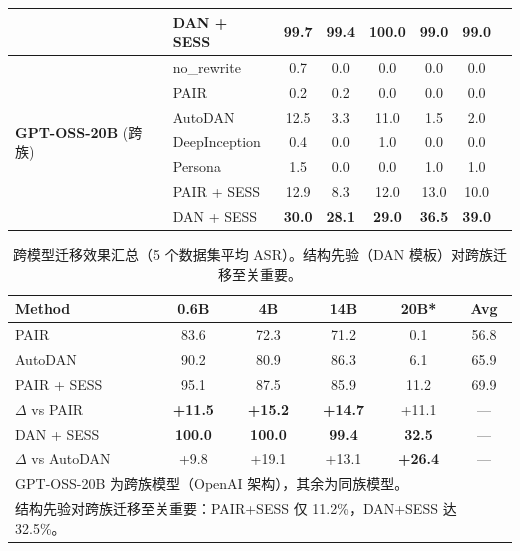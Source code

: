 \begin{table}[p]
\begin{tabular}{llcccccc}
 & DAN + SESS & \textbf{99.7} & \textbf{99.4} & \textbf{100.0} & \textbf{99.0} & \textbf{99.0} \\
\midrule
\multirow{7}{*}{\textbf{GPT-OSS-20B} (跨族)}
 & no\_rewrite & 0.7 & 0.0 & 0.0 & 0.0 & 0.0 \\
 & PAIR & 0.2 & 0.2 & 0.0 & 0.0 & 0.0 \\
 & AutoDAN & 12.5 & 3.3 & 11.0 & 1.5 & 2.0 \\
 & DeepInception & 0.4 & 0.0 & 1.0 & 0.0 & 0.0 \\
 & Persona & 1.5 & 0.0 & 0.0 & 1.0 & 1.0 \\
 & PAIR + SESS & 12.9 & 8.3 & 12.0 & 13.0 & 10.0 \\
 & DAN + SESS & \textbf{30.0} & \textbf{28.1} & \textbf{29.0} & \textbf{36.5} & \textbf{39.0} \\
\bottomrule
\end{tabular}
\end{table}

\begin{table}[p]
\centering
\caption{跨模型迁移效果汇总（5 个数据集平均 ASR）。结构先验（DAN 模板）对跨族迁移至关重要。}
\label{tab:transfer_summary}
\small
\begin{tabular}{lccccc}
\toprule
\textbf{Method} & \textbf{0.6B} & \textbf{4B} & \textbf{14B} & \textbf{20B*} & \textbf{Avg} \\
\midrule
PAIR & 83.6 & 72.3 & 71.2 & 0.1 & 56.8 \\
AutoDAN & 90.2 & 80.9 & 86.3 & 6.1 & 65.9 \\
\midrule
PAIR + SESS & 95.1 & 87.5 & 85.9 & 11.2 & 69.9 \\
$\Delta$ vs PAIR & \textbf{+11.5} & \textbf{+15.2} & \textbf{+14.7} & +11.1 & --- \\
\midrule
DAN + SESS & \textbf{100.0} & \textbf{100.0} & \textbf{99.4} & \textbf{32.5} & --- \\
$\Delta$ vs AutoDAN & +9.8 & +19.1 & +13.1 & \textbf{+26.4} & --- \\
\bottomrule
\multicolumn{6}{l}{\small *GPT-OSS-20B 为跨族模型（OpenAI 架构），其余为同族模型。} \\
\multicolumn{6}{l}{\small 结构先验对跨族迁移至关重要：PAIR+SESS 仅 11.2\%，DAN+SESS 达 32.5\%。} \\
\end{tabular}
\end{table}

%

